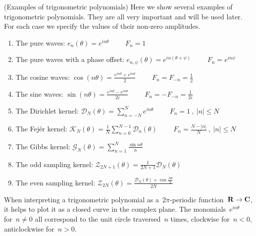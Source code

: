 \begin{definition}(Examples of trigonometric polynomials)
	Here we show several examples of trigonometric polynomials.  They are
	all very important and will be used later.  For each case we specify
	the values of their non-zero amplitudes.
\begin{enumerate}
	\item The pure waves: $e_n(\theta)=e^{in\theta}$
		$\qquad F_n=1$
	\item The pure waves with a phase offset:
		$e_{n,\psi}(\theta)=e^{in(\theta+\psi)}$
		$\qquad F_n=e^{in\psi}$
	\item The cosine waves:
		$\cos(n\theta)=\displaystyle\frac{e^{in\theta}+e^{in\theta}}{2}$
		$\qquad F_n=F_{-n}=\frac{1}{2}$
	\item The sine waves:
		$\sin(n\theta)=\displaystyle\frac{e^{in\theta}-e^{in\theta}}{2i}$
		$\qquad F_n=-F_{-n}=\frac{1}{2i}$
	\item The Dirichlet kernel:
		$\mathcal{D}_N(\theta)=\displaystyle\sum_{n=-N}^Ne^{in\theta}$
		$\qquad F_n=1\ ,\ |n|\le N$
	\item The Fejér kernel:
		$\mathcal{K}_N(\theta)
		=\displaystyle\frac{1}{N}\sum_{n=0}^{N-1}\mathcal{D}_n(\theta)
		$%
		$\qquad F_n=\frac{N-|n|}{N}\ ,\ |n|\le N$
	\item The Gibbs kernel:
		$\mathcal{G}_N(\theta)
		=\displaystyle\sum_{n=1}^{N}\frac{\sin n\theta}{n}$
	\item The odd sampling kernel:
		$\mathcal{Z}_{2N+1}(\theta)=\frac{1}{2N+1}\mathcal{D}_N(\theta)$
	\item The even sampling kernel:
		$\mathcal{Z}_{2N}(\theta)=\frac{\mathcal{D}_N(\theta)+\cos\frac{N\theta}{2}}{2N}$
\end{enumerate}
\end{definition}


When interpreting a trigonometric polynomial as a~$2\pi$-periodic
function~$\mathbf{R}\to\mathbf{C}$, it helps to plot it as a closed curve in the complex
plane.  The monomials~$e^{in\theta}$ for~$n\neq 0$ all correspond to the unit
circle traversed~$n$ times, clockwise for~$n<0$, anticlockwise for~$n>0$.


